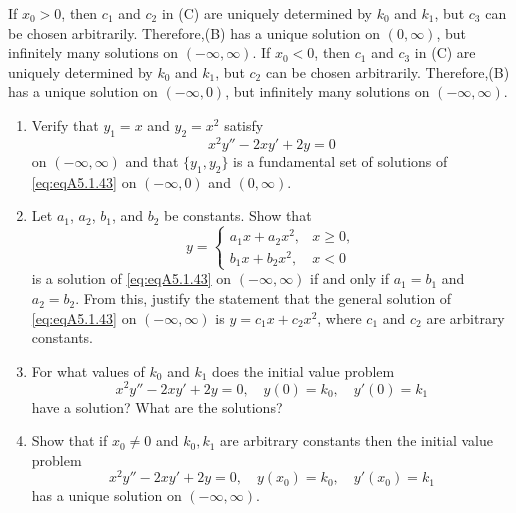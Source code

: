 \documentclass{ximera}
\begin{document}
\begin{problem}
\begin{enumerate}
\begin{solution}
    If $x_0>0$, then $c_1$ and $c_2$ in (C) are uniquely
determined by $k_0$ and $k_1$, but $c_3$ can be chosen arbitrarily.
Therefore,(B) has a unique solution on
$(0,\infty)$, but infinitely many solutions on $(-\infty,\infty)$.
  If $x_0<0$, then $c_1$ and $c_3$ in (C) are uniquely
determined by $k_0$ and $k_1$, but $c_2$ can be chosen arbitrarily.
Therefore,(B) has a unique solution on
$(-\infty,0)$, but infinitely many solutions on $(-\infty,\infty)$.
\end{solution}
\end{enumerate}
\end{problem}

\begin{problem}\label{exer:5.1.43} %
\begin{enumerate}
\item %
Verify  that $y_1=x$ and $y_2=x^2$ satisfy
\begin{equation}\label{eq:eqA5.1.43}
x^2y''-2xy'+2y=0
\end{equation}
on $(-\infty,\infty)$ and that $\{y_1,y_2\}$ is a fundamental set of
solutions of \ref{eq:eqA5.1.43} on $(-\infty,0)$ and
$(0,\infty)$.
\item %
Let $a_1$, $a_2$, $b_1$, and $b_2$ be constants. Show that
$$
y=\left\{\begin{array}{rr}
a_1x+a_2x^2,&x\ge 0,\\
b_1x+b_2x^2,&x<0\phantom{,}
\end{array}\right.
$$
is a solution of  \ref{eq:eqA5.1.43} on $(-\infty,\infty)$
if and only if $a_1=b_1$ and $a_2=b_2$. From this, justify the
statement that the
 general solution of \ref{eq:eqA5.1.43} on $(-\infty,\infty)$
is $y=c_1x+c_2x^2$, where $c_1$ and $c_2$ are arbitrary
constants.

\item %
 For what values of $k_0$ and  $k_1$
does the initial value problem
$$
x^2y''-2xy'+2y=0,\quad  y(0)=k_0,\quad y'(0)=k_1
$$
have a solution? What are the solutions?

\item %
 Show that if $x_0\ne0$ and $k_0,k_1$  are
arbitrary constants then the initial value problem
$$
x^2y''-2xy'+2y=0,\quad  y(x_0)=k_0,\quad y'(x_0)=k_1
$$
has a unique  solution on $(-\infty,\infty)$.
\end{enumerate}
\end{problem}
\end{document}
